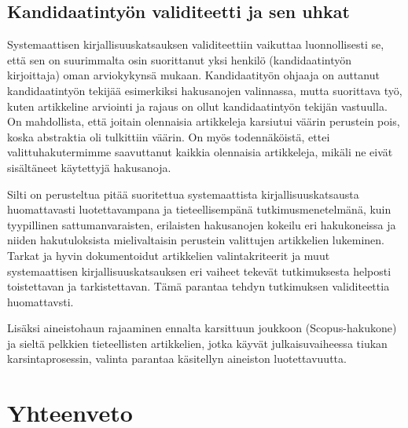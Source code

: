 \subsection{Kandidaatintyön validiteetti ja sen uhkat}
Systemaattisen kirjallisuuskatsauksen validiteettiin vaikuttaa luonnollisesti se, että sen on suurimmalta osin suorittanut yksi henkilö (kandidaatintyön kirjoittaja) oman arviokykynsä mukaan. Kandidaatityön ohjaaja on auttanut kandidaatintyön tekijää esimerkiksi hakusanojen valinnassa, mutta suorittava työ, kuten artikkeline arviointi ja rajaus on ollut kandidaatintyön tekijän vastuulla. On mahdollista, että joitain olennaisia artikkeleja karsiutui väärin perustein pois, koska abstraktia oli tulkittiin väärin. On myös todennäköistä, ettei valittuhakutermimme saavuttanut kaikkia olennaisia artikkeleja, mikäli ne eivät sisältäneet käytettyjä hakusanoja.

Silti on perusteltua pitää suoritettua systemaattista kirjallisuuskatsausta huomattavasti luotettavampana ja tieteellisempänä tutkimusmenetelmänä, kuin tyypillinen sattumanvaraisten, erilaisten hakusanojen kokeilu eri hakukoneissa ja niiden hakutuloksista mielivaltaisin perustein valittujen artikkelien lukeminen. Tarkat ja hyvin dokumentoidut artikkelien valintakriteerit ja muut systemaattisen kirjallisuuskatsauksen eri vaiheet tekevät tutkimuksesta helposti toistettavan ja tarkistettavan. Tämä parantaa tehdyn tutkimuksen validiteettia huomattavsti.

Lisäksi aineistohaun rajaaminen ennalta karsittuun joukkoon (Scopus-hakukone) ja sieltä pelkkien tieteellisten artikkelien, jotka käyvät julkaisuvaiheessa tiukan karsintaprosessin, valinta parantaa käsitellyn aineiston luotettavuutta.

\section{Yhteenveto}
